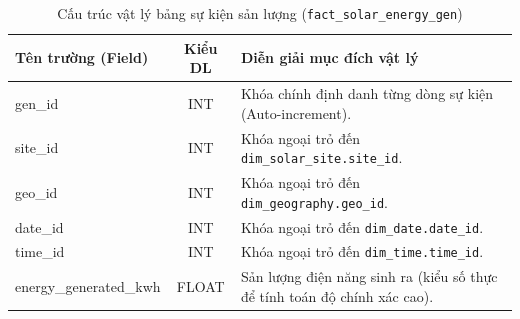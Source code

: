 \documentclass[12pt, a4paper]{report}
\begin{document}
\begin{table}[H]
\centering
\caption{Cấu trúc vật lý bảng sự kiện sản lượng (\texttt{fact\_solar\_energy\_gen})}
\label{tab:fact_gen_spec}
\renewcommand{\arraystretch}{1.4}
\begin{tabularx}{\textwidth}{p{4.5cm} c X}
\toprule
\textbf{Tên trường (Field)} & \textbf{Kiểu DL} & \textbf{Diễn giải mục đích vật lý} \\
\midrule
gen\_id & INT & Khóa chính định danh từng dòng sự kiện (Auto-increment). \\
site\_id & INT & Khóa ngoại trỏ đến \texttt{dim\_solar\_site.site\_id}. \\
geo\_id & INT & Khóa ngoại trỏ đến \texttt{dim\_geography.geo\_id}. \\
date\_id & INT & Khóa ngoại trỏ đến \texttt{dim\_date.date\_id}. \\
time\_id & INT & Khóa ngoại trỏ đến \texttt{dim\_time.time\_id}. \\
energy\_generated\_kwh & FLOAT & Sản lượng điện năng sinh ra (kiểu số thực để tính toán độ chính xác cao). \\
\bottomrule
\end{tabularx}
\end{table}
\end{document}
